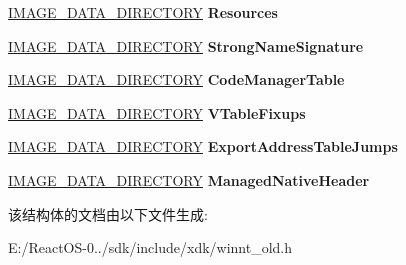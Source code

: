 \begin{DoxyCompactItemize}
\begin{tabbing}
\end{tabbing}\item 
\mbox{\label{struct_i_m_a_g_e___c_o_r20___h_e_a_d_e_r_adf72216031baae68500f72f99f67ca12}} 
\hyperlink{struct___i_m_a_g_e___d_a_t_a___d_i_r_e_c_t_o_r_y}{I\+M\+A\+G\+E\+\_\+\+D\+A\+T\+A\+\_\+\+D\+I\+R\+E\+C\+T\+O\+RY} {\bfseries Resources}
\item 
\mbox{\label{struct_i_m_a_g_e___c_o_r20___h_e_a_d_e_r_ae5b7d927174ea5569a24c9ef39bf6b59}} 
\hyperlink{struct___i_m_a_g_e___d_a_t_a___d_i_r_e_c_t_o_r_y}{I\+M\+A\+G\+E\+\_\+\+D\+A\+T\+A\+\_\+\+D\+I\+R\+E\+C\+T\+O\+RY} {\bfseries Strong\+Name\+Signature}
\item 
\mbox{\label{struct_i_m_a_g_e___c_o_r20___h_e_a_d_e_r_aec0203fd51464020defe6392623802ac}} 
\hyperlink{struct___i_m_a_g_e___d_a_t_a___d_i_r_e_c_t_o_r_y}{I\+M\+A\+G\+E\+\_\+\+D\+A\+T\+A\+\_\+\+D\+I\+R\+E\+C\+T\+O\+RY} {\bfseries Code\+Manager\+Table}
\item 
\mbox{\label{struct_i_m_a_g_e___c_o_r20___h_e_a_d_e_r_a0296f9d89046a1c776b543b522d0b6e0}} 
\hyperlink{struct___i_m_a_g_e___d_a_t_a___d_i_r_e_c_t_o_r_y}{I\+M\+A\+G\+E\+\_\+\+D\+A\+T\+A\+\_\+\+D\+I\+R\+E\+C\+T\+O\+RY} {\bfseries V\+Table\+Fixups}
\item 
\mbox{\label{struct_i_m_a_g_e___c_o_r20___h_e_a_d_e_r_a1c8102389784f1003e474b02ac459a66}} 
\hyperlink{struct___i_m_a_g_e___d_a_t_a___d_i_r_e_c_t_o_r_y}{I\+M\+A\+G\+E\+\_\+\+D\+A\+T\+A\+\_\+\+D\+I\+R\+E\+C\+T\+O\+RY} {\bfseries Export\+Address\+Table\+Jumps}
\item 
\mbox{\label{struct_i_m_a_g_e___c_o_r20___h_e_a_d_e_r_a077f48af88b3f19904b3b0b07d0030a0}} 
\hyperlink{struct___i_m_a_g_e___d_a_t_a___d_i_r_e_c_t_o_r_y}{I\+M\+A\+G\+E\+\_\+\+D\+A\+T\+A\+\_\+\+D\+I\+R\+E\+C\+T\+O\+RY} {\bfseries Managed\+Native\+Header}
\end{DoxyCompactItemize}


该结构体的文档由以下文件生成\+:\begin{DoxyCompactItemize}
\item 
E\+:/\+React\+O\+S-\/0../sdk/include/xdk/winnt\+\_\+old.\+h\end{DoxyCompactItemize}
